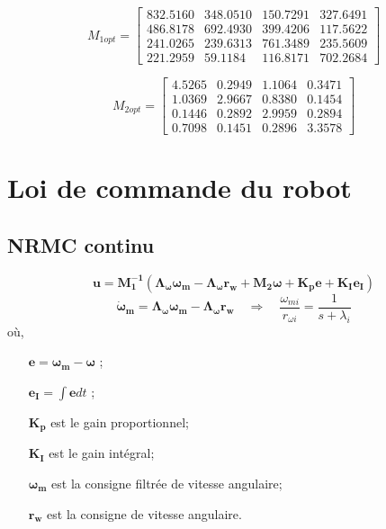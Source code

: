 \documentclass[12pt]{article}
\newcommand{\vect}[1]{\boldsymbol{#1}}
\begin{document}
\[
M_{1opt} = \begin{bmatrix}
		832.5160 & 348.0510 & 150.7291 & 327.6491 \\[0.3em]
        486.8178 & 692.4930 & 399.4206 & 117.5622 \\[0.3em]
        241.0265 & 239.6313 & 761.3489 & 235.5609 \\[0.3em]
        221.2959 &  59.1184 & 116.8171 & 702.2684
     \end{bmatrix}
\]

\[
M_{2opt} = \begin{bmatrix}
        4.5265  &  0.2949  &  1.1064  &  0.3471 \\[0.3em]
        1.0369  &  2.9667  &  0.8380  &  0.1454 \\[0.3em]
        0.1446  &  0.2892  &  2.9959  &  0.2894 \\[0.3em]
        0.7098  &  0.1451  &  0.2896  &  3.3578
     \end{bmatrix}
\]


\section{Loi de commande du robot}

\subsection{NRMC continu}

\[
	\vect{u} = \vect{M_1^{-1}}\left( \vect{\Lambda_{\omega}}\vect{\omega_m} - \vect{\Lambda_{\omega}}\vect{r_w} +\vect{M_2\omega} +\vect{K_pe + K_Ie_I} \right)
\]
\[
	\vect{\dot{\omega}_m} = \vect{\Lambda_{\omega}}\vect{\omega_m} - \vect{\Lambda_{\omega}}\vect{r_w} \quad \Rightarrow \quad  \frac{\omega_{mi}}{r_{\omega i}} = \frac{1}{s+\lambda_i}
\]
où,
\begin{itemize}
	\item[$\vect{e} = \vect{\omega_m - \omega}$];
	\item[$\vect{e_I} = \int \vect{e} dt$];
	\item[$\vect{K_p}$] est le gain proportionnel;
	\item[$\vect{K_I}$]	est le gain intégral;
	\item[$\vect{\omega_m}$] est la consigne filtrée de vitesse angulaire;
	\item[$\vect{r_w}$] est la consigne de vitesse angulaire.
\end{itemize}
\end{document}
